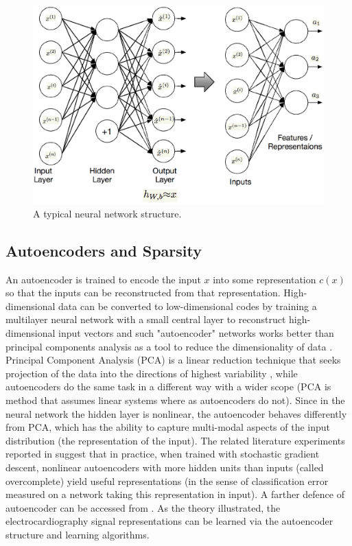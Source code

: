 \documentclass[graybox]{svmult}
\begin{document}
%
\begin{figure}[t]
\sidecaption
\includegraphics[scale=.5]{nnstructure}
%
%
\caption{A typical neural network structure.}
\label{fig:3}       %
\end{figure}



\subsection{Autoencoders and Sparsity}
An autoencoder is trained to encode the input $x$ into some representation $c(x)$ so that the inputs can be reconstructed from that representation. High-dimensional data can be converted to low-dimensional codes by training a multilayer neural network with a small central layer to reconstruct high-dimensional input vectors and such "autoencoder" networks works better than principal components analysis as a tool to reduce the dimensionality of data \citep{hinton2006reducing}. Principal Component Analysis (PCA) is a linear reduction technique that seeks projection of the data into the directions of highest variability \citep{duda2012pattern}, while autoencoders do the same task in a different way with a wider scope (PCA is method that assumes linear systems where as autoencoders do not). Since in the neural network the hidden layer is nonlinear, the autoencoder behaves differently from PCA, which has the ability to capture multi-modal aspects of the input distribution (the representation of the input). The related literature experiments reported in \citep{bengio2007greedy} suggest that in practice, when trained with stochastic gradient descent, nonlinear autoencoders with more hidden units than inputs (called overcomplete) yield useful representations (in the sense of classification error measured on a network taking this representation in input). A farther defence of autoencoder can be accessed from \citep{bengio2009learning}. As the theory illustrated, the electrocardiography signal representations can be learned via the autoencoder structure and learning algorithms.
\end{document}
